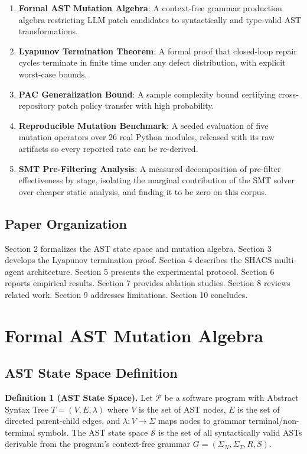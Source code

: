 \documentclass[10pt,twocolumn,letterpaper]{article}
\begin{document}
\begin{enumerate}
  \item \textbf{Formal AST Mutation Algebra}: A context-free grammar production algebra restricting LLM patch candidates to syntactically and type-valid AST transformations.
  \item \textbf{Lyapunov Termination Theorem}: A formal proof that closed-loop repair cycles terminate in finite time under any defect distribution, with explicit worst-case bounds.
  \item \textbf{PAC Generalization Bound}: A sample complexity bound certifying cross-repository patch policy transfer with high probability.
  \item \textbf{Reproducible Mutation Benchmark}: A seeded evaluation of five mutation operators over 26 real Python modules, released with its raw artifacts so every reported rate can be re-derived.
  \item \textbf{SMT Pre-Filtering Analysis}: A measured decomposition of pre-filter effectiveness by stage, isolating the marginal contribution of the SMT solver over cheaper static analysis, and finding it to be zero on this corpus.
\end{enumerate}


\subsection{Paper Organization}


Section 2 formalizes the AST state space and mutation algebra. Section 3 develops the Lyapunov termination proof. Section 4 describes the SHACS multi-agent architecture. Section 5 presents the experimental protocol. Section 6 reports empirical results. Section 7 provides ablation studies. Section 8 reviews related work. Section 9 addresses limitations. Section 10 concludes.




\section{Formal AST Mutation Algebra}



\subsection{AST State Space Definition}


\textbf{Definition 1 (AST State Space).} Let $\mathcal{P}$ be a software program with Abstract Syntax Tree $T = (V, E, \lambda)$ where $V$ is the set of AST nodes, $E$ is the set of directed parent-child edges, and $\lambda: V \rightarrow \Sigma$ maps nodes to grammar terminal/non-terminal symbols. The AST state space $\mathcal{S}$ is the set of all syntactically valid ASTs derivable from the program's context-free grammar $G = (\Sigma_N, \Sigma_T, R, S)$.
\end{document}
